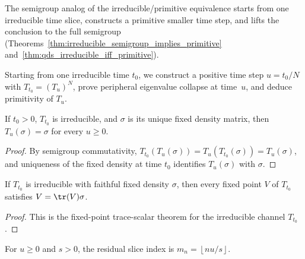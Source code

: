 \begin{remark}\leanok
    The semigroup analog of the irreducible/primitive equivalence
    starts from one irreducible time slice, constructs a primitive
    smaller time step, and lifts the conclusion to the full semigroup
    (Theorems~\ref{thm:irreducible_semigroup_implies_primitive}
    and~\ref{thm:qds_irreducible_iff_primitive}).
\end{remark}

\begin{remark}\leanok
    Starting from one irreducible time $t_0$, we construct a
    positive time step $u=t_0/N$ with
    $T_{t_0}=(T_u)^N$, prove peripheral eigenvalue collapse at time~$u$,
    and deduce primitivity of $T_u$.
\end{remark}

\begin{theorem}
    \label{thm:fixed_density_fixed_for_all_times_ch12}
    \leanok
    If $t_0>0$, $T_{t_0}$ is irreducible, and $\sigma$ is its unique fixed density
    matrix, then $T_u(\sigma)=\sigma$ for every $u\ge0$.
\end{theorem}

\begin{proof}
    \leanok
    By semigroup commutativity,
    $T_{t_0}(T_u(\sigma))=T_u(T_{t_0}(\sigma))=T_u(\sigma)$,
    and uniqueness of the fixed density at time $t_0$ identifies
    $T_u(\sigma)$ with $\sigma$.
\end{proof}

\begin{theorem}
    \label{thm:fixedPoint_eq_trace_smul_at_irreducible_time_ch12}
    \leanok
    If $T_{t_0}$ is irreducible with faithful fixed density $\sigma$, then every fixed point
    $V$ of $T_{t_0}$ satisfies $V=\tr(V)\sigma$.
\end{theorem}

\begin{proof}
    \leanok
    This is the fixed-point trace-scalar theorem for the irreducible channel $T_{t_0}$.
\end{proof}

\begin{definition}
    \label{def:residual_slice_index_ch12}
    \leanok
    For $u\ge0$ and $s>0$, the residual slice index is
    $m_n=\left\lfloor nu/s\right\rfloor$.
\end{definition}

